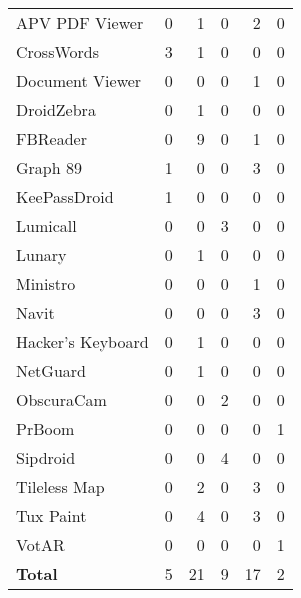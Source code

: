 \begin{table}[t]
\begin{tabular}{@{}l@{}||r|r|r|r|r@{}}
    APV PDF Viewer    & 0 & 1 & 0 & \cellcolor{\succcolor}2 & 0 \\ 
    CrossWords        & \cellcolor{\succcolor}3 & 1 & 0 & 0 & 0 \\ 
    Document Viewer   & 0 & 0 & 0 & \cellcolor{\succcolor}1 & 0 \\ 
    DroidZebra        & 0 & 1 & 0 & 0 & 0 \\ 
    FBReader          & 0 & 9 & 0 & \cellcolor{\succcolor}1 & 0 \\ 
    Graph 89          & \cellcolor{\succcolor}1 & 0 & 0 & \cellcolor{\succcolor}3 & 0 \\ 
    KeePassDroid      & \cellcolor{\succcolor}1 & 0 & 0 & 0 & 0 \\
    Lumicall          & 0 & 0 & \cellcolor{\succcolor}3 & 0 & 0 \\ 
    Lunary            & 0 & 1 & 0 & 0 & 0 \\
    Ministro          & 0 & 0 & 0 & \cellcolor{\succcolor}1 & 0 \\ 
    Navit             & 0 & 0 & 0 & \cellcolor{\succcolor}3 & 0 \\ 
    Hacker's Keyboard & 0 & 1 & 0 & 0 & 0 \\ 
    NetGuard          & 0 & 1 & 0 & 0 & 0 \\ 
    ObscuraCam        & 0 & 0 & \cellcolor{\succcolor}2 & 0 & 0 \\ 
    PrBoom            & 0 & 0 & 0 & 0 & \cellcolor{\succcolor}1 \\
    Sipdroid          & 0 & 0 & \cellcolor{\succcolor}4 & 0 & 0 \\ 
    Tileless Map      & 0 & 2 & 0 & \cellcolor{\succcolor}3 & 0 \\ 
    Tux Paint         & 0 & 4 & 0 & \cellcolor{\succcolor}3 & 0 \\ 
    VotAR             & 0 & 0 & 0 & 0 & \cellcolor{\succcolor}1 \\\hhline{=#=|=|=|=|=}
    \textbf{Total}    & 5 & 21 & 9 & 17 & 2 \\
  \end{tabular}
\end{table}
